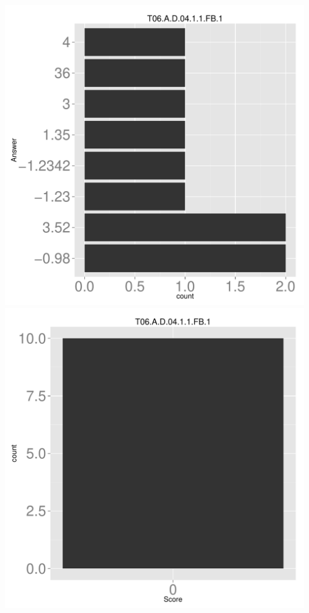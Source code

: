 \documentclass[12pt,english,nohyper]{tufte-handout}\usepackage[]{graphicx}\usepackage[]{color}
\begin{document}
\begin{center} \includegraphics[width=.45\linewidth]{Topic06_AB_13_answer} \includegraphics[width=.45\linewidth]{Topic06_AB_13_score} \end{center} 
\end{document}
